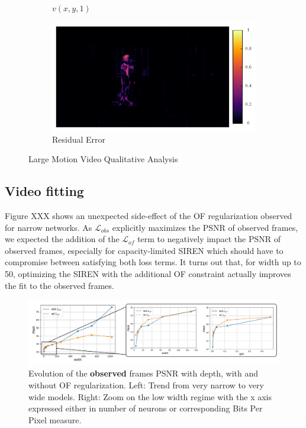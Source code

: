 \documentclass{article}
\begin{document}
\begin{figure}[h]
\begin{subfigure}{0.2\textwidth}
    \caption{$v(x,y,1)$}
\end{subfigure}%
\begin{subfigure}{0.2\textwidth}
	\centering
    \includegraphics[width=1\linewidth]{nd_scene/Skating_error.png}
    \caption{Residual Error}
\end{subfigure}
\caption{Large Motion Video Qualitative Analysis}
\end{figure}


\subsection{Video fitting}

Figure XXX shows an unexpected side-effect of the OF regularization observed for narrow networks.
As $\mathcal{L}_{obs}$ explicitly maximizes the PSNR of observed frames,
we expected the addition of the $\mathcal{L}_{of}$ term to negatively impact the PSNR of observed frames,
especially for capacity-limited SIREN which should have to compromise between satisfying both loss terms.
It turns out that, for width up to 50, optimizing the SIREN with the additional OF constraint
actually improves the fit to the observed frames.

\label{sec_video_fit}
\begin{figure}[h]
\centering
\includegraphics[width=1\textwidth]{compression.png}
\caption{Evolution of the \textbf{observed} frames PSNR with depth, with and without OF regularization.
Left: Trend from very narrow to very wide models.
Right: Zoom on the low width regime with the x axis expressed either in number of neurons or corresponding Bits Per Pixel measure.}
\end{figure}
\end{document}
